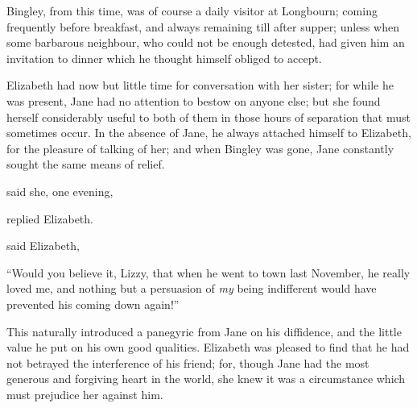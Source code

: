 Bingley, from this time, was of course a daily visitor at Longbourn; coming frequently before breakfast, and always remaining till after supper; unless when some barbarous neighbour, who could not be enough detested, had given him an invitation to dinner which he thought himself obliged to accept.

Elizabeth had now but little time for conversation with her sister; for while he was present, Jane had no attention to bestow on anyone else; but she found herself considerably useful to both of them in those hours of separation that must sometimes occur. In the absence of Jane, he always attached himself to Elizabeth, for the pleasure of talking of her; and when Bingley was gone, Jane constantly sought the same means of relief.

 said she, one evening, 

 replied Elizabeth. 


 said Elizabeth, 

“Would you believe it, Lizzy, that when he went to town last November, he really loved me, and nothing but a persuasion of {\em my} being indifferent would have prevented his coming down again!”


This naturally introduced a panegyric from Jane on his diffidence, and the little value he put on his own good qualities. Elizabeth was pleased to find that he had not betrayed the interference of his friend; for, though Jane had the most generous and forgiving heart in the world, she knew it was a circumstance which must prejudice her against him.

